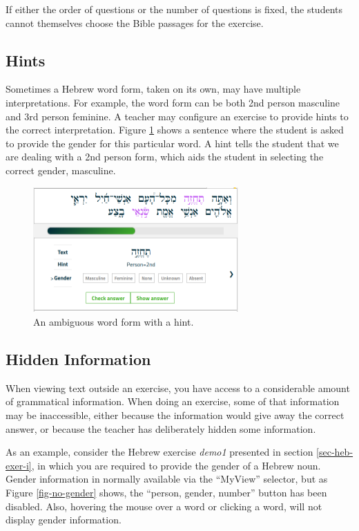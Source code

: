 \documentclass[11pt,oneside,a4paper]{memoir}
\newcommand{\heb}[1]{{\RL {\ezr #1}}}
\begin{document}
If either the order of questions or the number of questions is fixed, the students cannot themselves
choose the Bible passages for the exercise.


\subsection{Hints}

Sometimes a Hebrew word form, taken on its own, may have multiple interpretations. For example, the
word form \heb{תֶחֱזֶה} can be both 2nd person masculine and 3rd person feminine. A teacher may
configure an exercise to provide hints to the correct interpretation. Figure \ref{fig-ambig} shows
a sentence where the student is asked to provide the gender for this particular word. A hint tells
the student that we are dealing with a 2nd person form, which aids the student in selecting the
correct gender, masculine.

\begin{figure}
  \begin{center}
    \includegraphics[width=0.7\textwidth]{fig-ambig.png}
  \end{center}
  \caption{An ambiguous word form with a hint.}\label{fig-ambig}
\end{figure}


\subsection{Hidden Information}

When viewing text outside an exercise, you have access to a considerable amount of grammatical
information. When doing an exercise, some of that information may be inaccessible, either because
the information would give away the correct answer, or because the teacher has deliberately hidden
some information.

As an example, consider the Hebrew exercise \emph{demo1} presented in section \ref{sec-heb-exer-i}, in
which you are required to provide the gender of a Hebrew noun. Gender information in normally
available via the ``MyView'' selector, but as Figure \ref{fig-no-gender} shows, the ``person,
gender, number'' button has been disabled. Also, hovering the mouse over a word or clicking a word, will
not display gender information.
\end{document}
